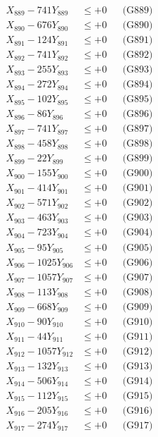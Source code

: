 \documentclass[a4paper,10pt]{article}
\begin{document}
{\begin{align}
X_{889} - 741Y_{889} &\leq +0 && \text{(G889)} \\
X_{890} - 676Y_{890} &\leq +0 && \text{(G890)} \\
\allowbreak
X_{891} - 124Y_{891} &\leq +0 && \text{(G891)} \\
X_{892} - 741Y_{892} &\leq +0 && \text{(G892)} \\
X_{893} - 255Y_{893} &\leq +0 && \text{(G893)} \\
X_{894} - 272Y_{894} &\leq +0 && \text{(G894)} \\
X_{895} - 102Y_{895} &\leq +0 && \text{(G895)} \\
X_{896} - 86Y_{896} &\leq +0 && \text{(G896)} \\
X_{897} - 741Y_{897} &\leq +0 && \text{(G897)} \\
X_{898} - 458Y_{898} &\leq +0 && \text{(G898)} \\
X_{899} - 22Y_{899} &\leq +0 && \text{(G899)} \\
X_{900} - 155Y_{900} &\leq +0 && \text{(G900)} \\
\allowbreak
X_{901} - 414Y_{901} &\leq +0 && \text{(G901)} \\
X_{902} - 571Y_{902} &\leq +0 && \text{(G902)} \\
X_{903} - 463Y_{903} &\leq +0 && \text{(G903)} \\
X_{904} - 723Y_{904} &\leq +0 && \text{(G904)} \\
X_{905} - 95Y_{905} &\leq +0 && \text{(G905)} \\
X_{906} - 1025Y_{906} &\leq +0 && \text{(G906)} \\
X_{907} - 1057Y_{907} &\leq +0 && \text{(G907)} \\
X_{908} - 113Y_{908} &\leq +0 && \text{(G908)} \\
X_{909} - 668Y_{909} &\leq +0 && \text{(G909)} \\
X_{910} - 90Y_{910} &\leq +0 && \text{(G910)} \\
\allowbreak
X_{911} - 44Y_{911} &\leq +0 && \text{(G911)} \\
X_{912} - 1057Y_{912} &\leq +0 && \text{(G912)} \\
X_{913} - 132Y_{913} &\leq +0 && \text{(G913)} \\
X_{914} - 506Y_{914} &\leq +0 && \text{(G914)} \\
X_{915} - 112Y_{915} &\leq +0 && \text{(G915)} \\
X_{916} - 205Y_{916} &\leq +0 && \text{(G916)} \\
X_{917} - 274Y_{917} &\leq +0 && \text{(G917)} \\

\end{align}}
\end{document}
